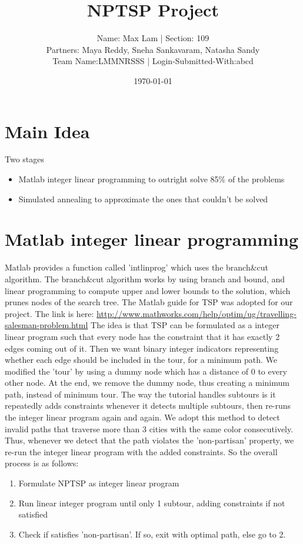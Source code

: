 \documentclass[11pt]{article}
\author{Name: Max Lam | Section: 109 \\ Partners: Maya Reddy, Sneha Sankavaram, Natasha Sandy \\ Team Name:LMMNRSSS | Login-Submitted-With:abcd}
\date{\today}
\title{NPTSP Project}
\begin{document}
\maketitle
\tableofcontents

\newpage


\section{Main Idea}
\label{sec-1}
Two stages
\begin{itemize}
\item Matlab integer linear programming to outright solve 85\% of the problems
\item Simulated annealing to approximate the ones that couldn't be solved
\end{itemize}

\section{Matlab integer linear programming}
\label{sec-2}
Matlab provides a function called 'intlinprog' which uses the branch\&cut algorithm.
The branch\&cut algorithm works by using branch and bound, and linear programming
to compute upper and lower bounds to the solution, which prunes nodes of the search tree.
The Matlab guide for TSP was adopted for our project.
The link is here: \url{http://www.mathworks.com/help/optim/ug/travelling-salesman-problem.html}
The idea is that TSP can be formulated as a integer linear program such that every node
has the constraint that it has exactly 2 edges coming out of it. Then we want binary integer
indicators representing whether each edge should be included in the tour, for a minimum path.
We modified the 'tour' by using a dummy node which has a distance of 0 to every other node.
At the end, we remove the dummy node, thus creating a minimum path, instead of minimum tour.
The way the tutorial handles subtours is it repeatedly adds constraints whenever it detects
multiple subtours, then re-runs the integer linear program again and again. We adopt this method
to detect invalid paths that traverse more than 3 cities with the same color consecutively.
Thus, whenever we detect that the path violates the 'non-partisan' property, we re-run the integer
linear program with the added constraints. So the overall process is as follows:\\
\begin{enumerate}
\item Formulate NPTSP as integer linear program
\item Run linear integer program until only 1 subtour, adding constraints if not satisfied
\item Check if satisfies 'non-partisan'. If so, exit with optimal path, else go to 2.
\end{enumerate}
\end{document}
